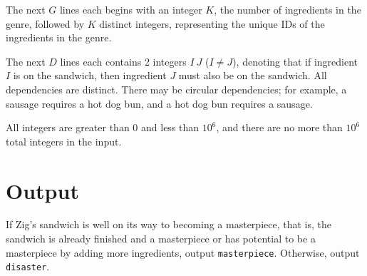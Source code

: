 The next $G$ lines each begins with an integer $K$, the number of ingredients in the genre,
followed by $K$ distinct integers, representing the unique IDs of the ingredients in the genre.

The next $D$ lines each contains 2 integers $I\ J$ ($I \neq J$),
denoting that if ingredient $I$ is on the sandwich, then ingredient
$J$ must also be on the sandwich.
All dependencies are distinct.
%
There may be circular dependencies; for example, a sausage requires a hot dog bun,
and a hot dog bun requires a sausage.

All integers are greater than $0$ and less than $10^6$, and there are
no more than $10^6$ total integers in the input.

\section*{Output}
If Zig's sandwich is well on its way to becoming a masterpiece,
that is, the sandwich is already finished and a masterpiece
or has potential to be a masterpiece by adding more ingredients,
output \texttt{masterpiece}.
Otherwise, output \texttt{disaster}.
